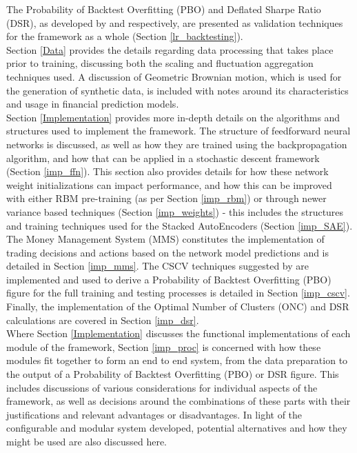 \documentclass[a4paper,11pt,oneside]{article}
\theoremstyle{plain}
\theoremstyle{definition}
\begin{document}
	The Probability of Backtest Overfitting (PBO) and Deflated Sharpe Ratio (DSR), as developed by \citet{BailyPBO} and \citet{PradoDSR} respectively, are presented as validation techniques for the framework as a whole (Section \ref{lr_backtesting}).	
	~\\\newline
	Section \ref{Data} provides the details regarding data processing that takes place prior to training, discussing both the scaling and fluctuation aggregation techniques used. A discussion of Geometric Brownian motion, which is used for the generation of synthetic data, is included with notes around its characteristics and usage in financial prediction models.
	~\\\newline
		Section \ref{Implementation} provides more in-depth details on the algorithms and structures used to implement the framework. The structure of feedforward neural networks is discussed, as well as how they are trained using the backpropagation algorithm, and how that can be applied in a stochastic descent framework (Section \ref{imp_ffn}). This section also provides details for how these network weight initializations can impact performance, and how this can be improved with either RBM pre-training (as per Section \ref{imp_rbm}) or through newer variance based techniques (Section \ref{imp_weights}) - this includes the structures and training techniques used for the Stacked AutoEncoders (Section \ref{imp_SAE}). The Money Management System (MMS) constitutes the implementation of trading decisions and actions based on the network model predictions and is detailed in Section \ref{imp_mms}. The CSCV techniques suggested by \citet{BailyPBO} are implemented and used to derive a Probability of Backtest Overfitting (PBO) figure for the full training and testing processes is detailed in Section \ref{imp_cscv}. Finally, the implementation of the Optimal Number of Clusters (ONC) and DSR calculations are covered in Section \ref{imp_dsr}.
	~\\\newline
		Where Section \ref{Implementation} discusses the functional implementations of each module of the framework, Section \ref{imp_proc} is concerned with how these modules fit together to form an end to end system, from the data preparation to the output of a Probability of Backtest Overfitting (PBO) or DSR figure. This includes discussions of various considerations for individual aspects of the framework, as well as decisions around the combinations of these parts with their justifications and relevant advantages or disadvantages. In light of the configurable and modular system developed, potential alternatives and how they might be used are also discussed here.
\end{document}
